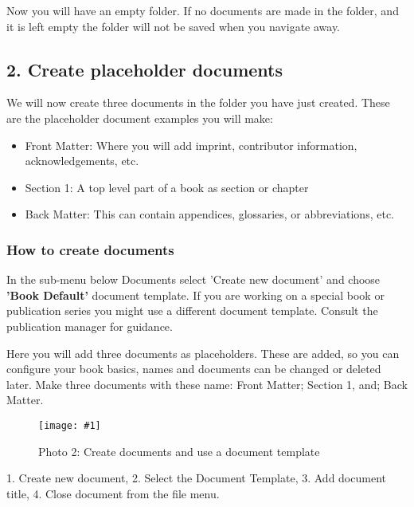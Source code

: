 \documentclass{article}
\newlength{\imgwidth}
\newcommand\scaledgraphics[2]{%
                
\settowidth{\imgwidth}{\texttt{[image: \#1]}}%
                
\setlength{\imgwidth}{\minof{\imgwidth}{#2\textwidth}}%
                
\texttt{[image: \#1]}%
                
}
\begin{document}
Now you will have an empty folder. If no documents are made in the folder, and it is left empty the folder will not be saved when you navigate away.


\subsection{2. Create placeholder documents }\label{H8214025}



We will now create three documents in the folder you have just created. These are the placeholder document examples you will make:

\begin{itemize}
\item Front Matter: Where you will add imprint, contributor information, acknowledgements, etc.


\item Section 1: A top level part of a book as section or chapter


\item Back Matter: This can contain appendices, glossaries, or abbreviations, etc.


\end{itemize}

\subsubsection{How to create documents}\label{H7006285}



In the sub-menu below Documents select 'Create new document' and choose \textbf{'Book Default'} document template. If you are working on a special book or publication series you might use a different document template. Consult the publication manager for guidance.


Here you will add three documents as placeholders. These are added, so you can configure your book basics, names and documents can be changed or deleted later. Make three documents with these name: Front Matter; Section 1, and; Back Matter.

\begin{figure}
\scaledgraphics{c08856bb-6601-4f76-9196-f85fd52b9756.png}{1}
\caption*{Photo 2: Create documents and use a document template}\label{F85303861}
\end{figure}


1. Create new document, 2. Select the Document Template, 3. Add document title, 4. Close document from the file menu. 
\end{document}

